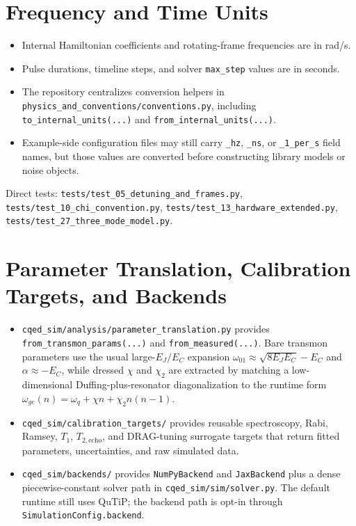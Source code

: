 \documentclass[11pt]{article}
\begin{document}
\section{Frequency and Time Units}
\begin{itemize}[leftmargin=1.5em]
  \item Internal Hamiltonian coefficients and rotating-frame frequencies are in rad/s.
  \item Pulse durations, timeline steps, and solver \texttt{max\_step} values are in seconds.
  \item The repository centralizes conversion helpers in
  \texttt{physics\_and\_conventions/conventions.py}, including
  \texttt{to\_internal\_units(...)} and \texttt{from\_internal\_units(...)}.
  \item Example-side configuration files may still carry \texttt{\_hz},
  \texttt{\_ns}, or \texttt{\_1\_per\_s} field names, but those values are converted
  before constructing library models or noise objects.
\end{itemize}

\noindent
Direct tests:
\texttt{tests/test\_05\_detuning\_and\_frames.py},
\texttt{tests/test\_10\_chi\_convention.py},
\texttt{tests/test\_13\_hardware\_extended.py},
\texttt{tests/test\_27\_three\_mode\_model.py}.

\section{Parameter Translation, Calibration Targets, and Backends}
\begin{itemize}[leftmargin=1.5em]
  \item \texttt{cqed\_sim/analysis/parameter\_translation.py} provides
  \texttt{from\_transmon\_params(...)} and \texttt{from\_measured(...)}. Bare
  transmon parameters use the usual large-\(E_J/E_C\) expansion
  \(\omega_{01}\approx\sqrt{8E_JE_C}-E_C\) and \(\alpha\approx-E_C\), while dressed
  \(\chi\) and \(\chi_2\) are extracted by matching a low-dimensional
  Duffing-plus-resonator diagonalization to the runtime form
  \(\omega_{ge}(n)=\omega_q+\chi n+\chi_2 n(n-1)\).
  \item \texttt{cqed\_sim/calibration\_targets/} provides reusable spectroscopy,
  Rabi, Ramsey, \(T_1\), \(T_{2,\mathrm{echo}}\), and DRAG-tuning surrogate targets
  that return fitted parameters, uncertainties, and raw simulated data.
  \item \texttt{cqed\_sim/backends/} provides \texttt{NumPyBackend} and
  \texttt{JaxBackend} plus a dense piecewise-constant solver path in
  \texttt{cqed\_sim/sim/solver.py}. The default runtime still uses QuTiP; the
  backend path is opt-in through \texttt{SimulationConfig.backend}.
\end{itemize}
\end{document}
